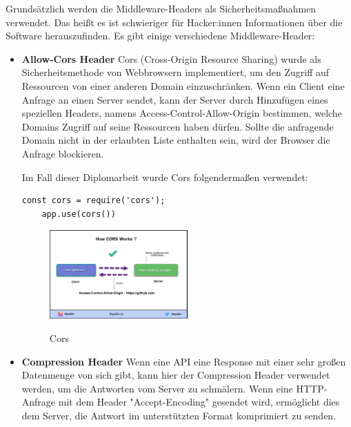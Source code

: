 Grundsätzlich werden die Middleware-Headers als Sicherheitsmaßnahmen verwendet. Das heißt es ist schwieriger für Hacker:innen Informationen über die Software herauszufinden. Es gibt einige verschiedene Middleware-Header:

\begin{itemize}
    \item \textbf{Allow-Cors Header}
        \newline
        Cors (Cross-Origin Resource Sharing) wurde als Sicherheitsmethode von Webbrowsern implementiert, um den Zugriff auf Ressourcen von einer anderen Domain einzuschränken. Wenn ein Client eine Anfrage an einen Server sendet, kann der Server durch Hinzufügen eines speziellen Headers, namens Access-Control-Allow-Origin bestimmen, welche Domains Zugriff auf seine Ressourcen haben dürfen. Sollte die anfragende Domain nicht in der erlaubten Liste enthalten sein, wird der Browser die Anfrage blockieren.

        Im Fall dieser Diplomarbeit wurde Cors folgendermaßen verwendet:

\begin{lstlisting}[caption=Verwendung von Cors]
    const cors = require('cors');
    app.use(cors())
\end{lstlisting}
                
\begin{figure}[h]
    \centering
    \includegraphics[width=0.5\textwidth]{pics/cors.png}
    \caption{Cors}
    \label{fig:mesh1}
    \cite{cors_grafik}
\end{figure}

        \cite{Cors}
    \item \textbf{Compression Header}
        \newline
        Wenn eine API eine Response mit einer sehr großen Datenmenge von sich gibt, kann hier der Compression Header verwendet werden, um die Antworten vom Server zu schmälern. Wenn eine HTTP-Anfrage mit dem Header "Accept-Encoding" gesendet wird, ermöglicht dies dem Server, die Antwort im unterstützten Format komprimiert zu senden.


\end{itemize}
